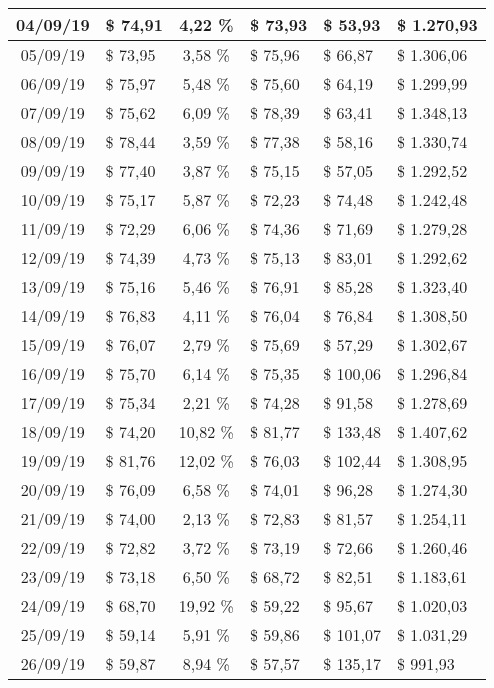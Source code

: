 \begin{center}
\begin{small}
\begin{longtable}{|c|l|c|l|l|l|}
04/09/19 & \$ 74,91 & 4,22 \% & \$ 73,93 & \$ 53,93 & \$ 1.270,93 \\ \hline
05/09/19 & \$ 73,95 & 3,58 \% & \$ 75,96 & \$ 66,87 & \$ 1.306,06 \\ \hline
06/09/19 & \$ 75,97 & 5,48 \% & \$ 75,60 & \$ 64,19 & \$ 1.299,99 \\ \hline
07/09/19 & \$ 75,62 & 6,09 \% & \$ 78,39 & \$ 63,41 & \$ 1.348,13 \\ \hline
08/09/19 & \$ 78,44 & 3,59 \% & \$ 77,38 & \$ 58,16 & \$ 1.330,74 \\ \hline
09/09/19 & \$ 77,40 & 3,87 \% & \$ 75,15 & \$ 57,05 & \$ 1.292,52 \\ \hline
10/09/19 & \$ 75,17 & 5,87 \% & \$ 72,23 & \$ 74,48 & \$ 1.242,48 \\ \hline
11/09/19 & \$ 72,29 & 6,06 \% & \$ 74,36 & \$ 71,69 & \$ 1.279,28 \\ \hline
12/09/19 & \$ 74,39 & 4,73 \% & \$ 75,13 & \$ 83,01 & \$ 1.292,62 \\ \hline
13/09/19 & \$ 75,16 & 5,46 \% & \$ 76,91 & \$ 85,28 & \$ 1.323,40 \\ \hline
14/09/19 & \$ 76,83 & 4,11 \% & \$ 76,04 & \$ 76,84 & \$ 1.308,50 \\ \hline
15/09/19 & \$ 76,07 & 2,79 \% & \$ 75,69 & \$ 57,29 & \$ 1.302,67 \\ \hline
16/09/19 & \$ 75,70 & 6,14 \% & \$ 75,35 & \$ 100,06 & \$ 1.296,84 \\ \hline
17/09/19 & \$ 75,34 & 2,21 \% & \$ 74,28 & \$ 91,58 & \$ 1.278,69 \\ \hline
18/09/19 & \$ 74,20 & 10,82 \% & \$ 81,77 & \$ 133,48 & \$ 1.407,62 \\ \hline
19/09/19 & \$ 81,76 & 12,02 \% & \$ 76,03 & \$ 102,44 & \$ 1.308,95 \\ \hline
20/09/19 & \$ 76,09 & 6,58 \% & \$ 74,01 & \$ 96,28 & \$ 1.274,30 \\ \hline
21/09/19 & \$ 74,00 & 2,13 \% & \$ 72,83 & \$ 81,57 & \$ 1.254,11 \\ \hline
22/09/19 & \$ 72,82 & 3,72 \% & \$ 73,19 & \$ 72,66 & \$ 1.260,46 \\ \hline
23/09/19 & \$ 73,18 & 6,50 \% & \$ 68,72 & \$ 82,51 & \$ 1.183,61 \\ \hline
24/09/19 & \$ 68,70 & 19,92 \% & \$ 59,22 & \$ 95,67 & \$ 1.020,03 \\ \hline
25/09/19 & \$ 59,14 & 5,91 \% & \$ 59,86 & \$ 101,07 & \$ 1.031,29 \\ \hline
26/09/19 & \$ 59,87 & 8,94 \% & \$ 57,57 & \$ 135,17 & \$ 991,93 \\ \hline

\end{longtable}
\end{small}
\end{center}
